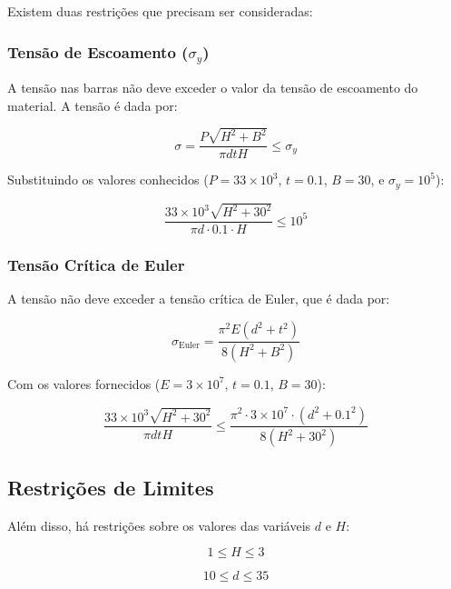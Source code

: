 \documentclass[a4paper, 12pt]{article}
\begin{document}
Existem duas restrições que precisam ser consideradas:

\subsubsection{Tensão de Escoamento (\(\sigma_y\))}

A tensão nas barras não deve exceder o valor da tensão de escoamento do material. A tensão é dada por:

\begin{equation}
    \sigma = \frac{P \sqrt{H^2 + B^2}}{\pi d t H} \leq \sigma_y
\end{equation}

Substituindo os valores conhecidos (\(P = 33 \times 10^3\), \(t = 0.1\), \(B = 30\), e \(\sigma_y = 10^5\)):

\begin{equation}
    \frac{33 \times 10^3 \sqrt{H^2 + 30^2}}{\pi d \cdot 0.1 \cdot H} \leq 10^5
\end{equation}

\subsubsection{Tensão Crítica de Euler}

A tensão não deve exceder a tensão crítica de Euler, que é dada por:

\begin{equation}
    \sigma_{\text{Euler}} = \frac{\pi^2 E (d^2 + t^2)}{8 (H^2 + B^2)}
\end{equation}

Com os valores fornecidos (\(E = 3 \times 10^7\), \(t = 0.1\), \(B = 30\)):

\begin{equation}
    \frac{33 \times 10^3 \sqrt{H^2 + 30^2}}{\pi d t H} \leq \frac{\pi^2 \cdot 3 \times 10^7 \cdot (d^2 + 0.1^2)}{8 (H^2 + 30^2)}
\end{equation}

\subsection{Restrições de Limites}

Além disso, há restrições sobre os valores das variáveis \( d \) e \( H \):

\begin{equation}
    1 \leq H \leq 3
\end{equation}

\begin{equation}
    10 \leq d \leq 35
\end{equation}
\end{document}
